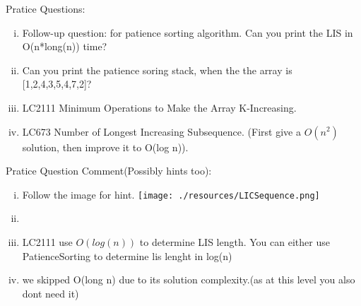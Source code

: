 Pratice Questions:
\begin{enumerate}[(i)]
    \item Follow-up question: for patience sorting algorithm. Can you print the LIS in O(n*long(n)) time?
    \item Can you print the patience soring stack, when the the array is [1,2,4,3,5,4,7,2]?
    \item LC2111  Minimum Operations to Make the Array K-Increasing.
    \item LC673  Number of Longest Increasing Subsequence. (First give a $O(n^2)$ solution, then improve it to O(log n)).
\end{enumerate}

\vspace{3cm}
Pratice Question Comment(Possibly hints too):
\begin{enumerate}[(i)]
    \item Follow the image for hint. \texttt{[image: ./resources/LICSequence.png]}
    \item 
    \item LC2111 use $O(log(n))$ to determine LIS length. You can either use PatienceSorting to determine lis lenght in log(n) 
    \item we skipped O(long n) due to its solution complexity.(as at this level you also dont need it)
\end{enumerate}
